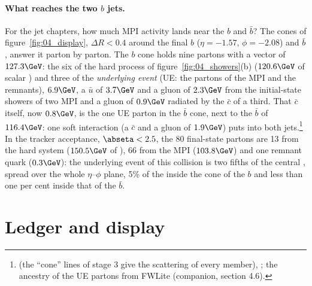 \paragraph{What reaches the two $b$ jets.}
For the jet chapters, how much MPI activity lands near the $b$ and $\bar b$? The cones of
figure~\ref{fig:04_display}, $\Delta R<0.4$ around the final $b$ ($\eta=-1.57$, $\phi=-2.08$) and $\bar b$,
answer it parton by parton. The $b$ cone holds nine partons with a vector \pt{} of $127.3\GeV$: the six of the
hard process of figure~\ref{fig:04_showers}(b) ($120.6\GeV$ of scalar \pt) and three of the \emph{underlying
event} (UE: the partons of the MPI and the remnants), $6.9\GeV$, a $\bar u$ of $3.7\GeV$ and a gluon of
$2.3\GeV$ from the initial-state showers of two MPI and a gluon of $0.9\GeV$ radiated by the $\bar c$ of a third.
That $\bar c$ itself, now $0.8\GeV$, is the one UE parton in the $\bar b$ cone, next to the $\bar b$ of
$116.4\GeV$: one soft interaction (a $\bar c$ and a gluon of $1.9\GeV$) puts \pt{} into both
jets.\footnote{ (the ``cone'' lines of stage 3 give the scattering of every
member), ; the ancestry of the UE partons from FWLite (companion, section 4.6).} In the
tracker acceptance, $\abseta<2.5$, the 80 final-state partons are 13 from the hard system ($150.5\GeV$ of \pt), 66 from the MPI ($103.8\GeV$) and one remnant quark ($0.3\GeV$): the underlying
event of this collision is two fifths of the central \pt, spread over the whole $\eta$--$\phi$ plane, 5\% of
the \pt{} inside the cone of the $b$ and less than one per cent inside that of the $\bar b$.

\section{Ledger and display}

